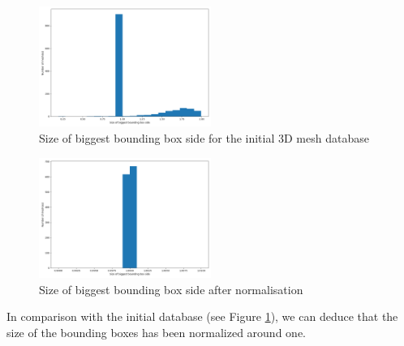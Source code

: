 \documentclass[10pt,twocolumn,letterpaper]{article}
\begin{document}
\begin{figure}[h!]
\begin{center}
  \includegraphics[width=0.5\textwidth]{picture/Initial size of biggest bounding box side}
  \caption{Size of biggest bounding box side for the initial 3D mesh database}
  \label{fig:box-size-before}
  \end{center}
\end{figure}

\begin{figure}[h!]
\begin{center}
  \includegraphics[width=0.5\textwidth]{picture/Normalised size of biggest bounding box side}
  \caption{Size of biggest bounding box side after normalisation}
  \label{fig:box-size-after}
  \end{center}
\end{figure}

In comparison with the initial database (see Figure \ref{fig:box-size-before}), we can deduce that the size of the bounding boxes has been normalized around one.
\medskip
\printbibliography
\end{document}
